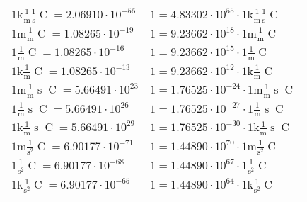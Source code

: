 \begin{center}
\begin{longtable}{l l}
{\color{gray}$1 \bm{\mathrm{ k}}\frac1{\operatorname{m}}\frac1{\operatorname{s}}{\operatorname{C}}{} = 2.06910\cdot10^{-56} $}   & {\color{gray}$ 1 = 4.83302\cdot10^{55} \cdot 1 \bm{\mathrm{ k}}\frac1{\operatorname{m}}\frac1{\operatorname{s}}{\operatorname{C}}{}$}  \\
{\color{gray}$1 \bm{\mathrm{ m}}\frac1{\operatorname{m}}{}{\operatorname{C}}{} = 1.08265\cdot10^{-19} $}   & {\color{gray}$ 1 = 9.23662\cdot10^{18} \cdot 1 \bm{\mathrm{ m}}\frac1{\operatorname{m}}{}{\operatorname{C}}{}$}  \\
{\color{black}$1 \bm{\mathrm{ }}\frac1{\operatorname{m}}{}{\operatorname{C}}{} = 1.08265\cdot10^{-16} $}   & {\color{black}$ 1 = 9.23662\cdot10^{15} \cdot 1 \bm{\mathrm{ }}\frac1{\operatorname{m}}{}{\operatorname{C}}{}$}  \\
{\color{gray}$1 \bm{\mathrm{ k}}\frac1{\operatorname{m}}{}{\operatorname{C}}{} = 1.08265\cdot10^{-13} $}   & {\color{gray}$ 1 = 9.23662\cdot10^{12} \cdot 1 \bm{\mathrm{ k}}\frac1{\operatorname{m}}{}{\operatorname{C}}{}$}  \\
{\color{gray}$1 \bm{\mathrm{ m}}\frac1{\operatorname{m}}{\operatorname{s}}{\operatorname{C}}{} = 5.66491\cdot10^{23} $}   & {\color{gray}$ 1 = 1.76525\cdot10^{-24} \cdot 1 \bm{\mathrm{ m}}\frac1{\operatorname{m}}{\operatorname{s}}{\operatorname{C}}{}$}  \\
{\color{black}$1 \bm{\mathrm{ }}\frac1{\operatorname{m}}{\operatorname{s}}{\operatorname{C}}{} = 5.66491\cdot10^{26} $}   & {\color{black}$ 1 = 1.76525\cdot10^{-27} \cdot 1 \bm{\mathrm{ }}\frac1{\operatorname{m}}{\operatorname{s}}{\operatorname{C}}{}$}  \\
{\color{gray}$1 \bm{\mathrm{ k}}\frac1{\operatorname{m}}{\operatorname{s}}{\operatorname{C}}{} = 5.66491\cdot10^{29} $}   & {\color{gray}$ 1 = 1.76525\cdot10^{-30} \cdot 1 \bm{\mathrm{ k}}\frac1{\operatorname{m}}{\operatorname{s}}{\operatorname{C}}{}$}  \\
{\color{gray}$1 \bm{\mathrm{ m}}{}\frac1{\operatorname{s}^2}{\operatorname{C}}{} = 6.90177\cdot10^{-71} $}   & {\color{gray}$ 1 = 1.44890\cdot10^{70} \cdot 1 \bm{\mathrm{ m}}{}\frac1{\operatorname{s}^2}{\operatorname{C}}{}$}  \\
{\color{black}$1 \bm{\mathrm{ }}{}\frac1{\operatorname{s}^2}{\operatorname{C}}{} = 6.90177\cdot10^{-68} $}   & {\color{black}$ 1 = 1.44890\cdot10^{67} \cdot 1 \bm{\mathrm{ }}{}\frac1{\operatorname{s}^2}{\operatorname{C}}{}$}  \\
{\color{gray}$1 \bm{\mathrm{ k}}{}\frac1{\operatorname{s}^2}{\operatorname{C}}{} = 6.90177\cdot10^{-65} $}   & {\color{gray}$ 1 = 1.44890\cdot10^{64} \cdot 1 \bm{\mathrm{ k}}{}\frac1{\operatorname{s}^2}{\operatorname{C}}{}$}  \\

\end{longtable}
\end{center}
